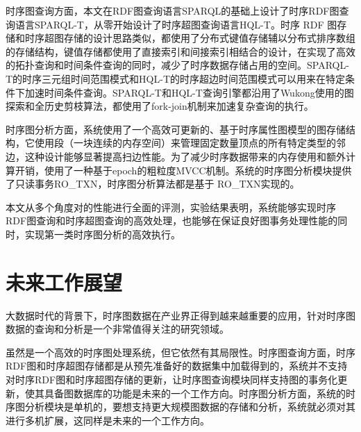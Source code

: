 时序图查询方面，本文在RDF图查询语言SPARQL的基础上设计了时序RDF图查询语言SPARQL-T，从零开始设计了时序超图查询语言HQL-T。时序 RDF 图存储和时序超图存储的设计思路类似，都使用了分布式键值存储辅以分布式排序数组的存储结构，键值存储都使用了直接索引和间接索引相结合的设计，在实现了高效的拓扑查询和时间条件查询的同时，减少了时序数据存储占用的空间。SPARQL-T的时序三元组时间范围模式和HQL-T的时序超边时间范围模式可以用来在特定条件下加速时间条件查询。SPARQL-T和HQL-T查询引擎都沿用了Wukong使用的图探索和全历史剪枝算法，都使用了fork-join机制来加速复杂查询的执行。

时序图分析方面，系统使用了一个高效可更新的、基于时序属性图模型的图存储结构\newstore，它使用段（一块连续的内存空间）来管理固定数量顶点的所有特定类型的邻边，这种设计能够显著提高扫边性能。为了减少时序数据带来的内存使用和额外计算开销，\newstore 使用了一种基于epoch的粗粒度MVCC机制。系统的时序图分析模块提供了只读事务RO\_TXN，时序图分析算法都是基于 RO\_TXN实现的。

本文从多个角度对\sys 的性能进行全面的评测，实验结果表明，系统能够实现时序RDF图查询和时序超图查询的高效处理，也能够在保证良好图事务处理性能的同时，实现第一类时序图分析的高效执行。

\section{未来工作展望}
大数据时代的背景下，时序图数据在产业界正得到越来越重要的应用，针对时序图数据的查询和分析是一个非常值得关注的研究领域。

\sys 虽然是一个高效的时序图处理系统，但它依然有其局限性。时序图查询方面，时序RDF图和时序超图存储都是从预先准备好的数据集中加载得到的，系统并不支持对时序RDF图和时序超图存储的更新，让时序图查询模块同样支持图的事务化更新，使其具备图数据库的功能是未来的一个工作方向。时序图分析方面，系统的时序图分析模块是单机的，要想支持更大规模图数据的存储和分析，系统就必须对其进行多机扩展，这同样是未来的一个工作方向。